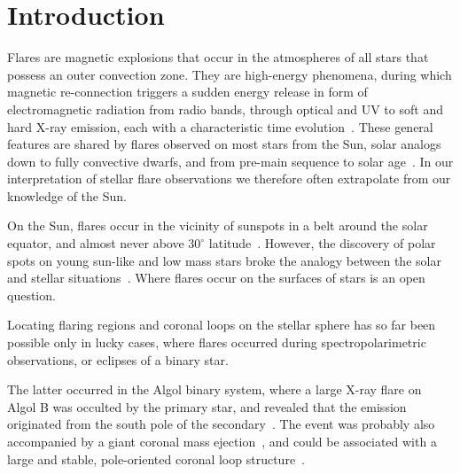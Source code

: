 \documentclass[proof]{WileyASNA-v1}
\newcommand{\jdag}[1]{\textcolor{darkred}{#1}}
\begin{document}


\section{Introduction}\label{sec:intro}

Flares are magnetic explosions that occur in the atmospheres of all stars that possess an outer convection zone. They are high-energy phenomena, during which magnetic re-connection triggers a sudden energy release in form of electromagnetic radiation from radio bands, through optical and UV to soft and hard X-ray emission, each with a characteristic time evolution~\citep{priest2002}. These general features are shared by flares observed on most stars from the Sun, solar analogs down to fully convective dwarfs, and from pre-main sequence to solar age~\citep[see, e.g.,][]{getman2005,walkowicz2011, benz2017,paudel2018}. In our interpretation of stellar flare observations we therefore often extrapolate from our knowledge of the Sun.%

On the Sun, flares occur in the vicinity of sunspots in a belt around the solar equator, and almost never above $30^\circ$ latitude~\citep{chen2011}. However, the discovery of polar spots on young sun-like and low mass stars broke the analogy between the solar and stellar situations~\citep{strassmeier2002}. Where flares occur on the surfaces of stars is an open question. %

Locating flaring regions and coronal loops on the stellar sphere has so far been possible only in lucky cases, where flares occurred during spectropolarimetric observations, or eclipses of a binary star. 

The latter occurred in the Algol binary system, where a large X-ray flare on Algol B was occulted by the primary star, and revealed that the emission originated from the south pole of the secondary~\citep{schmitt1999}. The event was probably also accompanied by a giant coronal mass ejection~\citep[CME,][]{moschou2017}, and could be associated with a large and stable, pole-oriented coronal loop structure~\citep{peterson2010}.%
\end{document}
